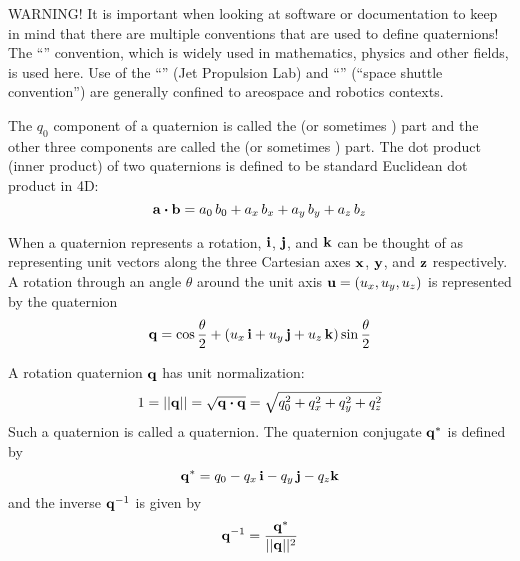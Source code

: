 WARNING! It is important when looking at software or documentation to keep in mind that there are
multiple conventions that are used to define quaternions! The ``'' convention, which is
widely used in mathematics, physics and other fields, is used here. Use of the ``'' (Jet
Propulsion Lab) and ``'' (``space shuttle convention'')  are generally
confined to areospace and robotics contexts\cite{b:yazell,b:sommer}.

The $q_0$ component of a quaternion is called the  (or sometimes ) part and the
other three components are called the  (or sometimes ) part. The dot
product (inner product) of two quaternions is defined to be standard Euclidean dot product in 4D:
\begin{equation}
  {\bf a} \mathbin{\boldsymbol{\cdot}} {\bf b} = a_0 \, b_0 + a_x \, b_x + a_y \, b_y + a_z \, b_z
\end{equation}

When a quaternion represents a rotation, ${\bf i}$, ${\bf j}$, and ${\bf k}$ can be thought of as representing unit
vectors along the three Cartesian axes ${\bf x}$, ${\bf y}$, and ${\bf z}$ respectively. A rotation through an angle
$\theta$ around the unit axis ${\bf u} = (u_x, u_y, u_z)$ is represented by the quaternion
\begin{equation}
  {\bf q} = \cos\frac{\theta}{2} + (u_x \, {\bf i} + u_y \, {\bf j} + u_z \, {\bf k}) \sin\frac{\theta}{2}
  \label{qt2ui}
\end{equation}

A rotation quaternion ${\bf q}$ has unit normalization:
\begin{equation}
  1 = ||{\bf q}|| = \sqrt{{\bf q} \mathbin{\boldsymbol{\cdot}} {\bf q}} = \sqrt{q_0^2 + q_x^2 + q_y^2 + q_z^2}
  \label{1qqq}
\end{equation}
Such a quaternion is called a  quaternion.
The quaternion conjugate ${\bf q}^*$ is defined by
\begin{equation}
  {\bf q}^* = q_0 - q_x \, {\bf i} - q_y \, {\bf j} - q_z {\bf k}
\end{equation}
and the inverse ${\bf q}^{-1}$ is given by
\begin{equation}
  {\bf q}^{-1} = \frac{{\bf q}^*}{||{\bf q}||^2}
\end{equation}


